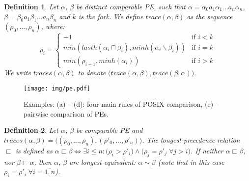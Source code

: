 \documentclass[AMA,STIX1COL]{WileyNJD-v2}
\newtheorem{Xdef}{Definition}
\begin{document}
    \begin{Xdef}
    Let $\alpha$, $\beta$ be distinct comparable PE, such that
    $\alpha = \alpha_0 a_1 \alpha_1 \dots a_n \alpha_n$,
    $\beta = \beta_0 a_1 \beta_1 \dots a_n \beta_n$ and $k$ is the fork.
    We define $trace (\alpha, \beta)$ as the sequence $(\rho_0, \dots, \rho_n)$, where:
    $$
    \rho_i = \begin{cases}
        -1 &\text{if } i < k \\
        min (lasth (\alpha_i \sqcap \beta_i), minh(\alpha_i \backslash \beta_i)) &\text{if } i = k \\
        min (\rho_{i-1}, minh(\alpha_i)) &\text{if } i > k
    \end{cases}
    $$
    We write $traces(\alpha, \beta)$ to denote $\big( trace (\alpha, \beta), trace (\beta, \alpha) \big)$.
    \end{Xdef}

\begin{figure}\label{fig_pe}
\texttt{[image: img/pe.pdf]}
\caption{
Examples: (a) -- (d): four main rules of POSIX comparison,
(e) -- pairwise comparison of PEs.
}
\end{figure}

    \begin{Xdef}\label{prec1}
    Let $\alpha$, $\beta$ be comparable PE and
    $traces(\alpha, \beta) = \big( (\rho_0, \dots, \rho_n), (\rho'_0, \dots, \rho'_n) \big)$.
    The \emph{longest-precedence} relation $\sqsubset$ is defined as
    $\alpha \sqsubset \beta \Leftrightarrow \exists i \leq n:
        \big( \rho_i > \rho'_i \big) \wedge
        \big( \rho_j = \rho'_j \; \forall j > i \big)$.
    If neither $\alpha \sqsubset \beta$, nor $\beta \sqsubset \alpha$,
    then $\alpha$, $\beta$ are \emph{longest-equivalent}: $\alpha \sim \beta$
    (note that in this case $\rho_i = \rho'_i \; \forall i = \overline {1, n}$).
    \end{Xdef}
\end{document}
